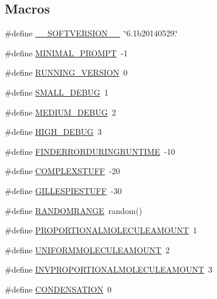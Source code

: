 \subsection*{Macros}
\begin{DoxyCompactItemize}
\item 
\#define \hyperlink{a00051_aab38659c2fe462437b89a1e85e619dc7}{\+\_\+\+\_\+\+S\+O\+F\+T\+V\+E\+R\+S\+I\+O\+N\+\_\+\+\_\+}~\char`\"{}6.\+1b20140529.\char`\"{}
\item 
\#define \hyperlink{a00051_a972f6696f10f8159f336357f003493b6}{M\+I\+N\+I\+M\+A\+L\+\_\+\+P\+R\+O\+M\+P\+T}~-\/1
\item 
\#define \hyperlink{a00051_a72244054b9e2e45fe85cbef84bd42904}{R\+U\+N\+N\+I\+N\+G\+\_\+\+V\+E\+R\+S\+I\+O\+N}~0
\item 
\#define \hyperlink{a00051_a6f7711b8195edb3c3541c153ebcb4bfa}{S\+M\+A\+L\+L\+\_\+\+D\+E\+B\+U\+G}~1
\item 
\#define \hyperlink{a00051_ab0ead5a0a8c59ad5f4d9fcf0be28a5d7}{M\+E\+D\+I\+U\+M\+\_\+\+D\+E\+B\+U\+G}~2
\item 
\#define \hyperlink{a00051_ac2a71f467524d5299cbff5df96be638a}{H\+I\+G\+H\+\_\+\+D\+E\+B\+U\+G}~3
\item 
\#define \hyperlink{a00051_a0934dca9b46dc1ce8ccae606a6511f63}{F\+I\+N\+D\+E\+R\+R\+O\+R\+D\+U\+R\+I\+N\+G\+R\+U\+N\+T\+I\+M\+E}~-\/10
\item 
\#define \hyperlink{a00051_a186bfb39322832c790ce5403bc04330d}{C\+O\+M\+P\+L\+E\+X\+S\+T\+U\+F\+F}~-\/20
\item 
\#define \hyperlink{a00051_a27f5d30679c0e8877ba9246eb1a48ff4}{G\+I\+L\+L\+E\+S\+P\+I\+E\+S\+T\+U\+F\+F}~-\/30
\item 
\#define \hyperlink{a00051_a4cb4f6978b0d938a0523bd6946e7609d}{R\+A\+N\+D\+O\+M\+R\+A\+N\+G\+E}~random()
\item 
\#define \hyperlink{a00051_a79c4b6317fd327fd5a62d65036481a25}{P\+R\+O\+P\+O\+R\+T\+I\+O\+N\+A\+L\+M\+O\+L\+E\+C\+U\+L\+E\+A\+M\+O\+U\+N\+T}~1
\item 
\#define \hyperlink{a00051_a6236cb136896f6bcbc6694d394e8aca3}{U\+N\+I\+F\+O\+R\+M\+M\+O\+L\+E\+C\+U\+L\+E\+A\+M\+O\+U\+N\+T}~2
\item 
\#define \hyperlink{a00051_ae36555e0be87892071c6340cc0fa43ad}{I\+N\+V\+P\+R\+O\+P\+O\+R\+T\+I\+O\+N\+A\+L\+M\+O\+L\+E\+C\+U\+L\+E\+A\+M\+O\+U\+N\+T}~3
\item 
\#define \hyperlink{a00051_aeeaf3e004dff03f70f94e0cf7d623b3c}{C\+O\+N\+D\+E\+N\+S\+A\+T\+I\+O\+N}~0
\item 

\end{DoxyCompactItemize}
